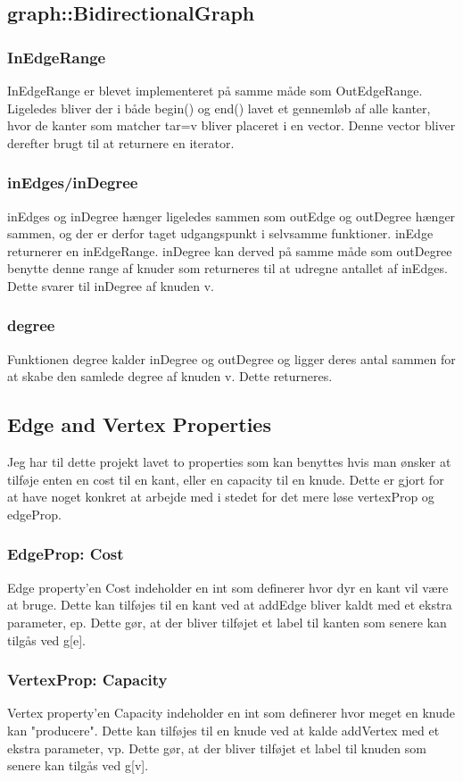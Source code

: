 \documentclass[a4paper,10pt,titlepage]{article}
\begin{document}
\subsection{graph::BidirectionalGraph}
\subsubsection{InEdgeRange}
InEdgeRange er blevet implementeret på samme måde som OutEdgeRange. Ligeledes bliver der i både begin() og end() lavet et gennemløb af alle kanter, hvor de kanter som matcher tar=v bliver placeret i en vector. Denne vector bliver derefter brugt til at returnere en iterator.
\subsubsection{inEdges/inDegree}
inEdges og inDegree hænger ligeledes sammen som outEdge og outDegree hænger sammen, og der er derfor taget udgangspunkt i selvsamme funktioner. inEdge returnerer en inEdgeRange. inDegree kan derved på samme måde som outDegree benytte denne range af knuder som returneres til at udregne antallet af inEdges. Dette svarer til inDegree af knuden v.
\subsubsection{degree}
Funktionen degree kalder inDegree og outDegree og ligger deres antal sammen for at skabe den samlede degree af knuden v. Dette returneres.

\subsection{Edge and Vertex Properties}
Jeg har til dette projekt lavet to properties som kan benyttes hvis man ønsker at tilføje enten en cost til en kant, eller en capacity til en knude. Dette er gjort for at have noget konkret at arbejde med i stedet for det mere løse vertexProp og edgeProp.
\subsubsection{EdgeProp: Cost}
Edge property'en Cost indeholder en int som definerer hvor dyr en kant vil være at bruge. Dette kan tilføjes til en kant ved at addEdge bliver kaldt med et ekstra parameter, ep. Dette gør, at der bliver tilføjet et label til kanten som senere kan tilgås ved g[e].
\subsubsection{VertexProp: Capacity}
Vertex property'en Capacity indeholder en int som definerer hvor meget en knude kan "producere". Dette kan tilføjes til en knude ved at kalde addVertex med et ekstra parameter, vp. Dette gør, at der bliver tilføjet et label til knuden som senere kan tilgås ved g[v].
\end{document}
